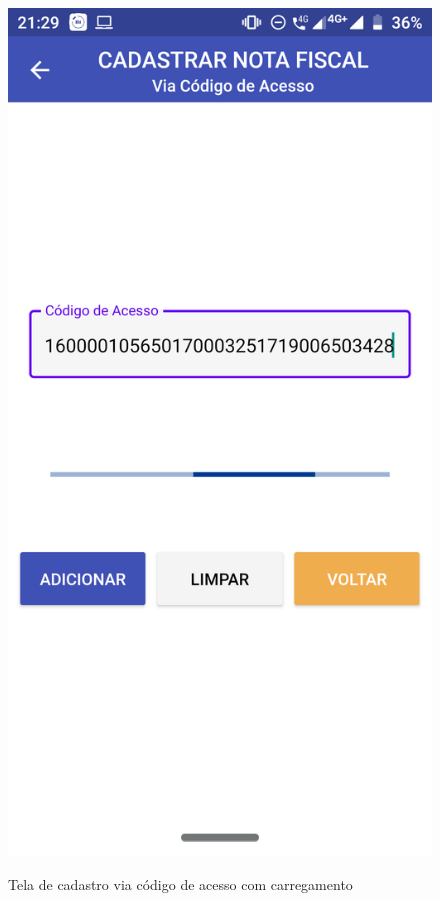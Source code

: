 \begin{figure}[h]
    \label{appCodigoAcessoComCodigoFig}
\end{figure}

\begin{figure}[h]
    \centering
    \caption{Tela de cadastro via código de acesso com carregamento}
    \includegraphics[scale=0.15]{tcc/figures/app/app_codigo_acesso_loading.png}
    \label{appCodigoAcessoCarregamentoCaptchaFig}
\end{figure}

